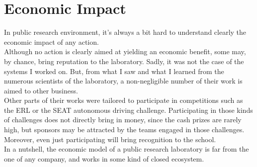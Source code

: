 \chapter{Economic Impact}

\label{economic}

In public research environment, it's always a bit hard to understand clearly the economic impact of any action.\\

Although no action is clearly aimed at yielding an economic benefit, some may, by chance, bring reputation to the laboratory.
Sadly, it was not the case of the systems I worked on.
But, from what I saw and what I learned from the numerous scientists of the laboratory, a non-negligible number of their work is aimed to other business.\\

Other parts of their works were tailored to participate in competitions such as the ERL or the SEAT autonomous driving challenge.
Participating in those kinds of challenges does not directly bring in money, since the cash prizes are rarely high, but sponsors may be attracted by the teams engaged in those challenges.
Moreover, even just participating will bring recognition to the school.\\

In a nutshell, the economic model of a public research laboratory is far from the one of any company, and works in some kind of closed ecosystem.
